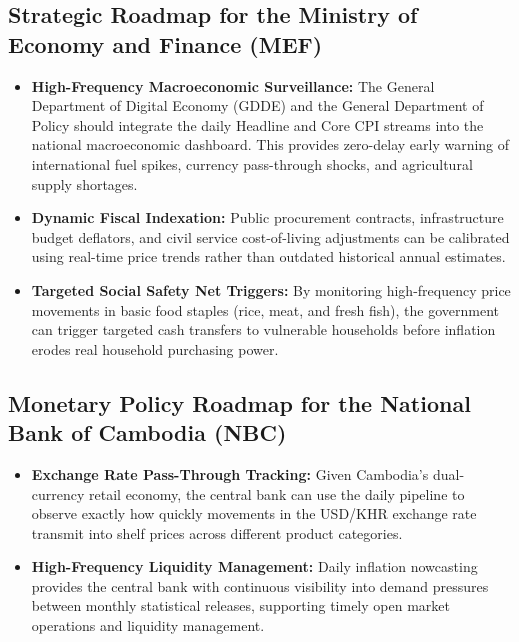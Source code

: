 \subsection{Strategic Roadmap for the Ministry of Economy and Finance (MEF)}
\begin{itemize}
    \item \textbf{High-Frequency Macroeconomic Surveillance:} The General Department of Digital Economy (GDDE) and the General Department of Policy should integrate the daily Headline and Core CPI streams into the national macroeconomic dashboard. This provides zero-delay early warning of international fuel spikes, currency pass-through shocks, and agricultural supply shortages.
    \item \textbf{Dynamic Fiscal Indexation:} Public procurement contracts, infrastructure budget deflators, and civil service cost-of-living adjustments can be calibrated using real-time price trends rather than outdated historical annual estimates.
    \item \textbf{Targeted Social Safety Net Triggers:} By monitoring high-frequency price movements in basic food staples (rice, meat, and fresh fish), the government can trigger targeted cash transfers to vulnerable households before inflation erodes real household purchasing power.
\end{itemize}

\subsection{Monetary Policy Roadmap for the National Bank of Cambodia (NBC)}
\begin{itemize}
    \item \textbf{Exchange Rate Pass-Through Tracking:} Given Cambodia's dual-currency retail economy, the central bank can use the daily pipeline to observe exactly how quickly movements in the USD/KHR exchange rate transmit into shelf prices across different product categories.
    \item \textbf{High-Frequency Liquidity Management:} Daily inflation nowcasting provides the central bank with continuous visibility into demand pressures between monthly statistical releases, supporting timely open market operations and liquidity management.
\end{itemize}

